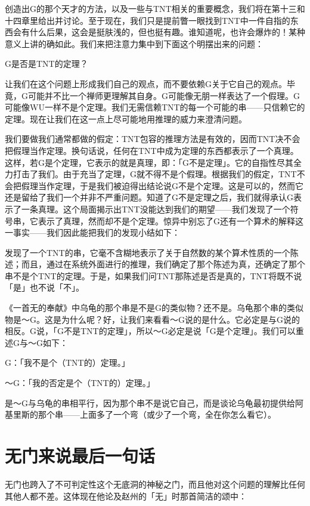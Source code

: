 \documentclass[
  12pt,
  twoside,
  openright,
  oldfontcommands,
]{memoir}
\begin{document}
创造出G的那个天才的方法，以及一些与TNT相关的重要概念，我们将在第十三和十四章里给出并讨论。至于现在，我们只是提前瞥一眼找到TNT中一件自指的东西会有什么后果，这会是挺肤浅的，但也挺有趣。谁知道呢，也许会爆炸的！某种意义上讲的确如此。我们来把注意力集中到下面这个明摆出来的问题：

G是否是TNT的定理？

让我们在这个问题上形成我们自己的观点，而不要依赖G关于它自己的观点。毕竟，G可能并不比一个禅师更理解其自身。G可能像无朋一样表达了一个假理。G可能像WU一样不是个定理。我们无需信赖TNT的每一个可能的串------只信赖它的定理。现在让我们在这一点上尽可能地用推理的威力来澄清问题。

我们要做我们通常都做的假定：TNT包容的推理方法是有效的，因而TNT决不会把假理当作定理。换句话说，任何在TNT中成为定理的东西都表示了一个真理。这样，若G是个定理，它表示的就是真理，即：「G不是定理」。它的自指性尽其全力打击了我们。由于充当了定理，G就不得不是个假理。根据我们的假定，TNT不会把假理当作定理，于是我们被迫得出结论说G不是个定理。这是可以的，然而它还是留给了我们一个并非不严重问题。知道了G不是定理之后，我们就得承认G表示了一条真理。这个局面揭示出TNT没能达到我们的期望------我们发现了一个符号串，它表示了真理，然而却不是个定理。惊异中别忘了G还有一个算术的解释这一事实------我们因此能把我们的发现小结如下：

发现了一个TNT的串，它毫不含糊地表示了关于自然数的某个算术性质的一个陈述；而且，通过在系统外面进行的推理，我们确定了那个陈述为真，还确定了那个串不是个TNT的定理。于是，如果我们问TNT那陈述是否是真的，TNT将既不说「是」也不说「不」。

《一首无的奉献》中乌龟的那个串是不是G的类似物？还不是。乌龟那个串的类似物是～G。这是为什么呢？好，让我们来看看～G说的是什么。它必定是与G说的相反。G说，「G不是TNT的定理」，所以～G必定是说「G是个定理」。我们可以重述G与～G如下：

G：「我不是个（TNT的）定理。」

～G：「我的否定是个（TNT的）定理。」

是～G与乌龟的串相平行，因为那个串不是说它自己，而是谈论乌龟最初提供给阿基里斯的那个串------上面多了一个弯（或少了一个弯，全在你怎么看它）。

\section{无门来说最后一句话}

无门也跨入了不可判定性这个无底洞的神秘之门，而且他对这个问题的理解比任何其他人都不差。这体现在他论及赵州的「无」时那首简洁的颂中：
\end{document}
